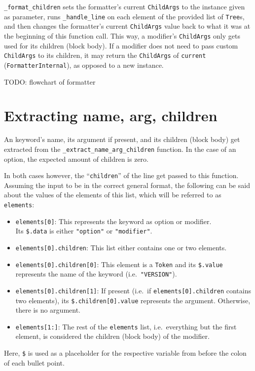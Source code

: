 \verb|_format_children| sets the formatter's current \verb|ChildArgs| to the instance given as parameter, runs \verb|_handle_line| on each element of the provided list of \verb|Tree|s, and then changes the formatter's current \verb|ChildArgs| value back to what it was at the beginning of this function call. This way, a modifier's \verb|ChildArgs| only gets used for its children (block body). If a modifier does not need to pass custom \verb|ChildArgs| to its children, it may return the \verb|ChildArgs| of \verb|current| (\verb|FormatterInternal|), as opposed to a new instance. 

TODO: flowchart of formatter

\section{Extracting name, arg, children}

An keyword's name, its argument if present, and its children (block body) get extracted from the \verb|_extract_name_arg_children| function. In the case of an option, the expected amount of children is zero. 

In both cases however, the ``\verb|children|'' of the line get passed to this function. Assuming the input to be in the correct general format, the following can be said about the values of the elements of this list, which will be referred to as \verb|elements|:

\begin{itemize}
    \item \verb|elements[0]|: This represents the keyword as option or modifier.\\ 
    Its \verb|$.data| is either \verb|"option"| or \verb|"modifier"|.
    \item \verb|elements[0].children|: This list either contains one or two elements.
    \item \verb|elements[0].children[0]|: This element is a \verb|Token| and its \verb|$.value| represents the name of the keyword (i.e.\ \verb|"VERSION"|). 
    \item \verb|elements[0].children[1]|: If present (i.e.\ if \verb|elements[0].children| contains two elements), its \verb|$.children[0].value| represents the argument. Otherwise, there is no argument. 
    \item \verb|elements[1:]|: The rest of the \verb|elements| list, i.e.\ everything but the first element, is considered the children (block body) of the modifier.
\end{itemize}

Here, \verb|$| is used as a placeholder for the respective variable from before the colon of each bullet point.

